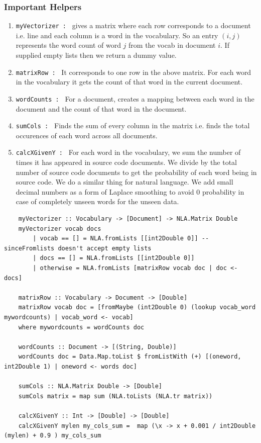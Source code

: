 \documentclass[12pt]{scrreprt}
\newcommand{\ttt}[1]{\texttt{#1}}
\begin{document}
\subsubsection{Important Helpers}
\begin{enumerate}
    \item \ttt{myVectorizer : } gives a matrix where each row corresponds to a document i.e. line and each column is a word in the vocabulary. So an entry $(i,j)$ represents the word count of word $j$ from the vocab in document $i$. If supplied empty lists then we return a dummy value.
    \item \ttt{matrixRow : } It corresponds to one row in the above matrix. For each word in the vocabulary it gets the count of that word in the current document.
    \item \ttt{wordCounts : } For a document, creates a mapping between each word in the document and the count of that word in the document.
    \item \ttt{sumCols : } Finds the sum of every column in the matrix i.e. finds the total occurences of each word across all documents.
    \item \ttt{calcXGivenY : } For each word in the vocabulary, we sum the number of times it has appeared in source code documents. We divide by the total number of source code documents to get the probability of each word being in source code. We do a similar thing for natural language. We add small decimal numbers as a form of Laplace smoothing to avoid 0 probability in case of completely unseen words for the unseen data.
\end{enumerate}

\begin{verbatim}
    myVectorizer :: Vocabulary -> [Document] -> NLA.Matrix Double
    myVectorizer vocab docs
        | vocab == [] = NLA.fromLists [[int2Double 0]] -- sinceFromlists doesn't accept empty lists
        | docs == [] = NLA.fromLists [[int2Double 0]]
        | otherwise = NLA.fromLists [matrixRow vocab doc | doc <- docs]

    matrixRow :: Vocabulary -> Document -> [Double]
    matrixRow vocab doc = [fromMaybe (int2Double 0) (lookup vocab_word mywordcounts) | vocab_word <- vocab]
    where mywordcounts = wordCounts doc

    wordCounts :: Document -> [(String, Double)]
    wordCounts doc = Data.Map.toList $ fromListWith (+) [(oneword, int2Double 1) | oneword <- words doc]

    sumCols :: NLA.Matrix Double -> [Double]
    sumCols matrix = map sum (NLA.toLists (NLA.tr matrix))

    calcXGivenY :: Int -> [Double] -> [Double]
    calcXGivenY mylen my_cols_sum =  map (\x -> x + 0.001 / int2Double (mylen) + 0.9 ) my_cols_sum

   \end{verbatim}
\end{document}
